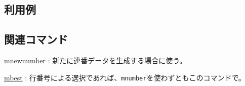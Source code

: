 \subsection*{利用例}


\subsection*{関連コマンド}
\hyperref[sect:mnewnumber]{mnewnumber} : 新たに連番データを生成する場合に使う。

\hyperref[sect:mbest]{mbest} : 行番号による選択であれば、\verb|mnumber|を使わずともこのコマンドで。

%
